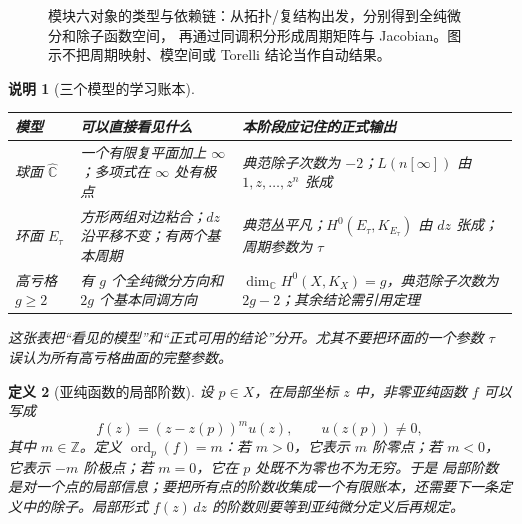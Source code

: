 \documentclass[UTF8,fontset=none,a4paper,11pt]{ctexart}
\theoremstyle{foundation-definition}
\newtheorem{definition}{定义}[section]
\theoremstyle{foundation-theorem}
\theoremstyle{foundation-proposition}
\theoremstyle{foundation-example}
\theoremstyle{foundation-remark}
\newtheorem{remark}[definition]{说明}
\theoremstyle{foundation-theorem}
\begin{document}
\begin{figure}[htbp]
\caption{模块六对象的类型与依赖链：从拓扑/复结构出发，分别得到全纯微分和除子函数空间，
再通过同调积分形成周期矩阵与 Jacobian。图示不把周期映射、模空间或 Torelli 结论当作自动结果。}
\label{fig:riemann-object-type-map}
\end{figure}

\begin{remark}[三个模型的学习账本]
\begin{center}
{\small
\setlength{\tabcolsep}{4pt}
\begin{tabularx}{\textwidth}{p{}|p{}|X}
\toprule
模型 & 可以直接看见什么 & 本阶段应记住的正式输出 \\
\midrule
球面 \(\widehat{\mathbb C}\) & 一个有限复平面加上 \(\infty\)；多项式在 \(\infty\) 处有极点 & 典范除子次数为 \(-2\)；\(L(n[\infty])\) 由 \(1,z,\ldots,z^n\) 张成 \\
环面 \(E_\tau\) & 方形两组对边粘合；\(dz\) 沿平移不变；有两个基本周期 & 典范丛平凡；\(H^0(E_\tau,K_{E_\tau})\) 由 \(dz\) 张成；周期参数为 \(\tau\) \\
高亏格 \(g\geq2\) & 有 \(g\) 个全纯微分方向和 \(2g\) 个基本同调方向 & \(\dim_{\mathbb C}H^0(X,K_X)=g\)，典范除子次数为 \(2g-2\)；其余结论需引用定理 \\
\bottomrule
\end{tabularx}}
\end{center}
这张表把“看见的模型”和“正式可用的结论”分开。尤其不要把环面的一个参数 \(\tau\) 误认为所有高亏格曲面的完整参数。
\end{remark}

\begin{definition}[亚纯函数的局部阶数]\label{def:order-divisor}
设 \(p\in X\)，在局部坐标 \(z\) 中，非零亚纯函数 \(f\) 可以写成
\[
f(z)=(z-z(p))^m u(z),\qquad u(z(p))\neq0,
\]
其中 \(m\in\mathbb Z\)。定义 \(\operatorname{ord}_p(f)=m\)：若 \(m>0\)，它表示 \(m\) 阶零点；若 \(m<0\)，它表示 \(-m\) 阶极点；若 \(m=0\)，它在 \(p\) 处既不为零也不为无穷。于是
局部阶数是对一个点的局部信息；要把所有点的阶数收集成一个有限账本，还需要下一条定义中的除子。局部形式 \(f(z)\,dz\) 的阶数则要等到亚纯微分定义后再规定。
\end{definition}
\end{document}
